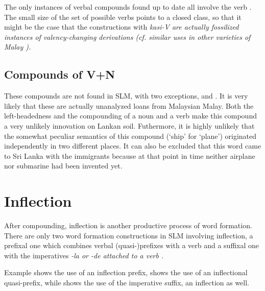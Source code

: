 The only instances of verbal compounds found up to date all involve the verb . The small size of the set of possible verbs points to a closed class, so that it might be the  case that the constructions with \em kasi-V \em are actually fossilized instances of valency-changing derivations (cf. similar uses in other varieties of Malay \citep{AdelaarEtAl1996, Bakker2006}).


\subsection{Compounds of V+N}\label{sec:wofo:CompoundsofV+N}
These compounds are not found in SLM, with two exceptions,  and . It is very likely that these are actually unanalyzed loans  from Malaysian Malay. Both the left-headedness and the compounding of a noun and a verb make this compound a very unlikely innovation on Lankan soil. Futhermore, it is highly unlikely that the somewhat peculiar semantics of this compound (`ship' for `plane') originated independently in two different places.
It can also be excluded that this word came to Sri Lanka with the immigrants because at that point in time neither airplane nor submarine had been invented yet.


\section{Inflection}\label{sec:wofo:Inflection}
After compounding, inflection is another productive process of word formation.
There are only two word formation constructions in SLM involving inflection, a prefixal one which combines verbal (quasi-)prefixes with a verb  and a suffixal one with the imperatives \em -la \em or \em -de \em attached to a verb .

Example  shows the use of an inflection prefix,  shows the use of an inflectional quasi-prefix, while  shows the use of the imperative suffix, an inflection as well.
 

